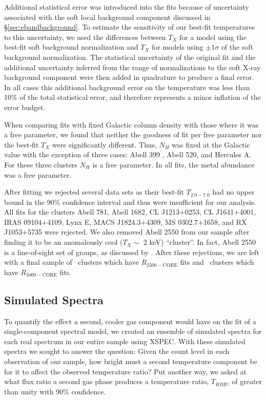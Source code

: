 Additional statistical error was introduced into the fits because of
uncertainty associated with the soft local background component
discussed in \S\ref{sec:ebandbackground}. To estimate the sensitivity of
our best-fit temperatures to this uncertainty, we used the differences
between $T_{X}$ for a model using the best-fit soft background
normalization and $T_{X}$ for models using $\pm1\sigma$ of the soft
background normalization. The statistical uncertainty of the original
fit and the additional uncertainty inferred from the range of
normalizations to the soft X-ray background component were then added
in quadrature to produce a final error. In all cases this additional
background error on the temperature was less than 10\% of the total
statistical error, and therefore represents a minor inflation of the
error budget.

When comparing fits with fixed Galactic column density with those
where it was a free parameter, we found that neither the goodness of
fit per free parameter nor the best-fit $T_{X}$ were significantly
different. Thus, $N_{H}$ was fixed at the Galactic value with the
exception of three cases: Abell 399 \citep{2004MNRAS.351.1439S}, Abell
520, and Hercules A. For these three clusters $N_{H}$ is a free
parameter. In all fits, the metal abundance was a free parameter.

After fitting we rejected several data sets as their best-fit
$T_{2.0-7.0}$ had no upper bound in the 90\% confidence interval and
thus were insufficient for our analysis. All fits for the clusters
Abell 781, Abell 1682, CL J1213+0253, CL J1641+4001, IRAS 09104+4109,
Lynx E, MACS J1824.3+4309, MS 0302.7+1658, and RX J1053+5735 were
rejected. We also removed Abell 2550 from our sample after finding it
to be an anomalously cool ($T_{X} \sim$ 2 keV) ``cluster''. In fact,
Abell 2550 is a line-of-sight set of groups, as discussed by
\citet{2004cgpc.sympE..31M}. After these rejections, we are left with a
final sample of \ebandnuma\ clusters which have $R_{2500-\mathrm{CORE}}$ fits
and \ebandnumb\ clusters which have $R_{5000-\mathrm{CORE}}$ fits.

\subsection{Simulated Spectra}
\label{sec:ebandsimulated}

To quantify the effect a second, cooler gas component would have on
the fit of a single-component spectral model, we created an ensemble
of simulated spectra for each real spectrum in our entire sample using
{\textsc{XSPEC}}. With these simulated spectra we sought to answer the
question: Given the count level in each observation of our sample, how
bright must a second temperature component be for it to affect the
observed temperature ratio? Put another way, we asked at what flux
ratio a second gas phase produces a temperature ratio, $T_{HBR}$, of
greater than unity with 90\% confidence.

